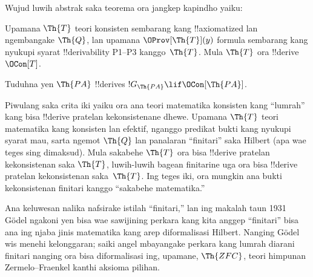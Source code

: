 \documentclass[../../../include/open-logic-section]{subfiles}
\begin{document}
Wujud luwih abstrak saka teorema ora jangkep kapindho yaiku:

\begin{thm}
 Upamana $\Th{T}$ teori
konsisten sembarang kang !!{axiomatized} lan ngembangake $\Th{Q}$,
lan upamana $\OProv[\Th{T}](y)$ formula sembarang kang nyukupi syarat
!!{derivability} P1--P3 kanggo~$\Th{T}$. Mula $\Th{T}$ ora
!!{derive}~$\OCon[T]$.
\end{thm}

\begin{prob}
Tuduhna yen $\Th{PA}$ !!{derive}s
$!G_{\Th{PA}} \lif \OCon[\Th{PA}]$.
\end{prob}

\begin{digress}
Piwulang saka crita iki yaiku ora ana teori matematika konsisten kang
``lumrah'' kang bisa !!{derive} pratelan kekonsistenane dhewe.
Upamana $\Th{T}$ teori matematika kang konsisten lan efektif, nganggo predikat bukti kang nyukupi syarat mau, sarta ngemot $\Th{Q}$ lan
panalaran ``finitari'' saka Hilbert (apa wae teges sing dimaksud).
Mula sakabehe $\Th{T}$ ora bisa !!{derive} pratelan
kekonsistenan saka $\Th{T}$, luwih-luwih bagean finitarine uga ora
bisa !!{derive} pratelan kekonsistenan saka~$\Th{T}$. Ing teges iki,
ora mungkin ana bukti kekonsistenan finitari kanggo
``sakabehe matematika.''

Ana keluwesan nalika nafsirake istilah ``finitari,'' lan ing makalah
taun 1931 G\"odel ngakoni yen bisa wae sawijining perkara kang
kita anggep ``finitari'' bisa ana ing njaba jinis matematika
kang arep diformalisasi Hilbert. Nanging G\"odel wis menehi
kelonggaran; saiki angel mbayangake perkara kang lumrah diarani
finitari nanging ora bisa diformalisasi ing, upamane, $\Th{ZFC}$,
teori himpunan Zermelo--Fraenkel kanthi aksioma pilihan.
\end{digress}
\end{document}
